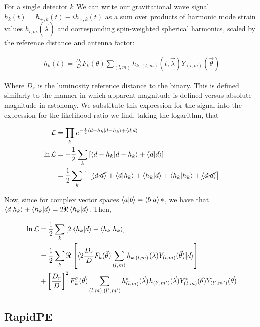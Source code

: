 For a single detector $k$ We can write our gravitational wave signal $h_k(t) = h_{+,k}(t) - ih_{\times, k}(t)$ as a sum over products of harmonic mode strain values $h_{l,m}(\vec{\lambda})$ and corresponding spin-weighted spherical harmonics, scaled by the reference distance and antenna factor:

\begin{align}
h_k(t) = \frac{D_r}{D}F_k(\theta)\sum_{(l,m)}h_{k, (l,m)}(t, \vec{\lambda})Y_{(l,m)}(\vec{\theta})
\end{align}

Where $D_r$ is the luminosity reference distance to the binary. This is defined similarly to the manner in which apparent magnitude is defined versus absolute magnitude in astonomy. We substitute this expression for the signal into the expression for the likelihood ratio we find, taking the logarithm, that

\begin{align}
\mathcal{L} &= \prod_k e^{-\frac{1}{2}\braket{d - h_k|d-h_k} + \braket{d|d}} \\
\ln\mathcal{L} &= -\frac{1}{2}\sum_{k}\left[\braket{d - h_k|d-h_k} + \braket{d|d}\right] \\
&= \frac{1}{2}\sum_{k}\left[-\cancel{\braket{d|d}}+\braket{d|h_k}+\braket{h_k|d}+\braket{h_k|h_k} + \cancel{\braket{d|d}}\right] \\
\end{align}

Now, since for complex vector spaces $\braket{a|b} = \braket{b|a}*$, we have that $\braket{d|h_k} + \braket{h_k|d} = 2\Re\braket{h_k|d}$. Then, 

\begin{align}
\ln\mathcal{L} &= \frac{1}{2}\sum_{k}\left[2\braket{h_k|d} + \braket{h_k|h_k}\right] \\
&= \frac{1}{2} \sum_{k}\Re\left[\braket{2\frac{D_r}{D}F_k(\vec{\theta})\sum_{(l,m)}h_{k,(l,m)}(\lambda)Y_{(l,m)}(\vec{\theta})|d}\right] \\
&+ \left[\frac{D_r}{D}\right]^2F_k^2(\vec{\theta})\sum_{(l,m),(l',m')}h^*_{(l,m)}(\vec{\lambda})h_{(l',m')}(\vec{\lambda})Y^*_{(l,m)}(\vec{\theta})Y_{(l',m')}(\vec{\theta})
\end{align}  



\subsection{RapidPE}

